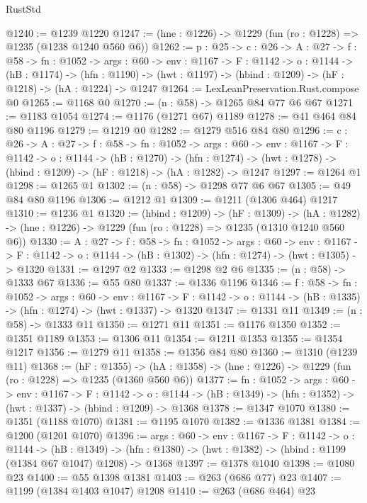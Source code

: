 \begin{lexlean}{RustStd}
\begin{coremodule}
@1240 := @1239 @1220
@1247 := (hne : @1226) -> @1229 (fun (ro : @1228) => @1235 (@1238 @1240 @560 @6))
@1262 := {p : @25} ->
  {c : @26} ->
  {A : @27} ->
  {f : @58} ->
  {fn : @1052} ->
  {args : @60} ->
  {env : @1167} ->
  {F : @1142} ->
  {o : @1144} ->
  (hB : @1174) ->
  (hfn : @1190) -> (hwt : @1197) -> (hbind : @1209) -> (hF : @1218) -> (hA : @1224) -> @1247
@1264 := LexLeanPreservation.Rust.compose @0
@1265 := @1168 @0
@1270 := (n : @58) -> @1265 @84 @77 @6 @67
@1271 := @1183 @1054
@1274 := @1176 (@1271 @67) @1189
@1278 := @41 @464 @84 @80 @1196
@1279 := @1219 @0
@1282 := @1279 @516 @84 @80
@1296 := {c : @26} ->
  {A : @27} ->
  {f : @58} ->
  {fn : @1052} ->
  {args : @60} ->
  {env : @1167} ->
  {F : @1142} ->
  {o : @1144} ->
  (hB : @1270) ->
  (hfn : @1274) -> (hwt : @1278) -> (hbind : @1209) -> (hF : @1218) -> (hA : @1282) -> @1247
@1297 := @1264 @1
@1298 := @1265 @1
@1302 := (n : @58) -> @1298 @77 @6 @67
@1305 := @49 @84 @80 @1196
@1306 := @1212 @1
@1309 := @1211 (@1306 @464) @1217
@1310 := @1236 @1
@1320 := (hbind : @1209) ->
  (hF : @1309) ->
  (hA : @1282) -> (hne : @1226) -> @1229 (fun (ro : @1228) => @1235 (@1310 @1240 @560 @6))
@1330 := {A : @27} ->
  {f : @58} ->
  {fn : @1052} ->
  {args : @60} ->
  {env : @1167} ->
  {F : @1142} -> {o : @1144} -> (hB : @1302) -> (hfn : @1274) -> (hwt : @1305) -> @1320
@1331 := @1297 @2
@1333 := @1298 @2 @6
@1335 := (n : @58) -> @1333 @67
@1336 := @55 @80
@1337 := @1336 @1196
@1346 := {f : @58} ->
  {fn : @1052} ->
  {args : @60} ->
  {env : @1167} ->
  {F : @1142} -> {o : @1144} -> (hB : @1335) -> (hfn : @1274) -> (hwt : @1337) -> @1320
@1347 := @1331 @11
@1349 := (n : @58) -> @1333 @11
@1350 := @1271 @11
@1351 := @1176 @1350
@1352 := @1351 @1189
@1353 := @1306 @11
@1354 := @1211 @1353
@1355 := @1354 @1217
@1356 := @1279 @11
@1358 := @1356 @84 @80
@1360 := @1310 (@1239 @11)
@1368 := (hF : @1355) ->
  (hA : @1358) -> (hne : @1226) -> @1229 (fun (ro : @1228) => @1235 (@1360 @560 @6))
@1377 := {fn : @1052} ->
  {args : @60} ->
  {env : @1167} ->
  {F : @1142} ->
  {o : @1144} -> (hB : @1349) -> (hfn : @1352) -> (hwt : @1337) -> (hbind : @1209) -> @1368
@1378 := @1347 @1070
@1380 := @1351 (@1188 @1070)
@1381 := @1195 @1070
@1382 := @1336 @1381
@1384 := @1200 (@1201 @1070)
@1396 := {args : @60} ->
  {env : @1167} ->
  {F : @1142} ->
  {o : @1144} ->
  (hB : @1349) -> (hfn : @1380) -> (hwt : @1382) -> (hbind : @1199 (@1384 @67 @1047) @1208) -> @1368
@1397 := @1378 @1040
@1398 := @1080 @23
@1400 := @55 @1398 @1381
@1403 := @263 (@686 @77) @23
@1407 := @1199 (@1384 @1403 @1047) @1208
@1410 := @263 (@686 @464) @23

\end{coremodule}
\end{lexlean}
